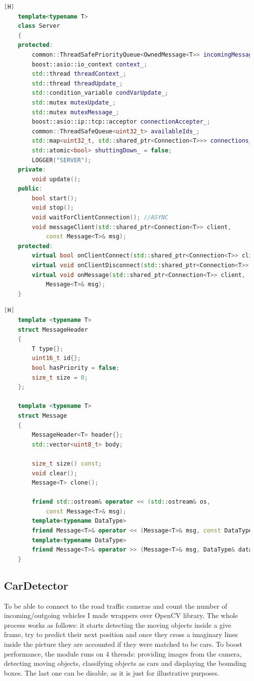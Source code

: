 \documentclass[17pt]{article}
\begin{document}
\pagebreak

\begin{lstlisting}[language = C++][H]
    template<typename T>
    class Server
    {
    protected:
        common::ThreadSafePriorityQueue<OwnedMessage<T>> incomingMessagesQueue_;
        boost::asio::io_context context_;
        std::thread threadContext_;
        std::thread threadUpdate_;
        std::condition_variable condVarUpdate_;
        std::mutex mutexUpdate_;
        std::mutex mutexMessage_;
        boost::asio::ip::tcp::acceptor connectionAccepter_;
        common::ThreadSafeQueue<uint32_t> availableIds_;
        std::map<uint32_t, std::shared_ptr<Connection<T>>> connections_;
        std::atomic<bool> shuttingDown_ = false;
        LOGGER("SERVER");
    private:
        void update();
    public:
        bool start();
        void stop();
        void waitForClientConnection(); //ASYNC
        void messageClient(std::shared_ptr<Connection<T>> client,
            const Message<T>& msg);
    protected:
        virtual bool onClientConnect(std::shared_ptr<Connection<T>> client);
        virtual void onClientDisconnect(std::shared_ptr<Connection<T>> client);
        virtual void onMessage(std::shared_ptr<Connection<T>> client,
            Message<T>& msg);
    }
\end{lstlisting}

\pagebreak

\begin{lstlisting}[language = C++][H]
    template <typename T>
    struct MessageHeader
    {
        T type{};
        uint16_t id{};
        bool hasPriority = false;
        size_t size = 0;
    };
    
    template <typename T>
    struct Message
    {
        MessageHeader<T> header{};
        std::vector<uint8_t> body;

        size_t size() const;
        void clear();
        Message<T> clone();

        friend std::ostream& operator << (std::ostream& os, 
            const Message<T>& msg);
        template<typename DataType>
        friend Message<T>& operator << (Message<T>& msg, const DataType& data)
        template<typename DataType>
        friend Message<T>& operator >> (Message<T>& msg, DataType& data)
    }
\end{lstlisting}   
\pagebreak

\subsection{CarDetector}
\indent \indent
To be able to connect to the road traffic cameras and count the number of 
incoming/outgoing vehicles I made wrappers over OpenCV library. The whole process 
works as follows: it starts detecting the moving objects inside a give frame, try to 
predict their next position and once they cross a imaginary lines inside the picture
they are accounted if they were matched to be cars. To boost performance, the 
module runs on 4 threads: providing images from the camera, detecting moving objects,
classifying objects as cars and displaying the bounding boxes. The last one can be 
disable, as it is just for illustrative purposes. \\
\end{document}
